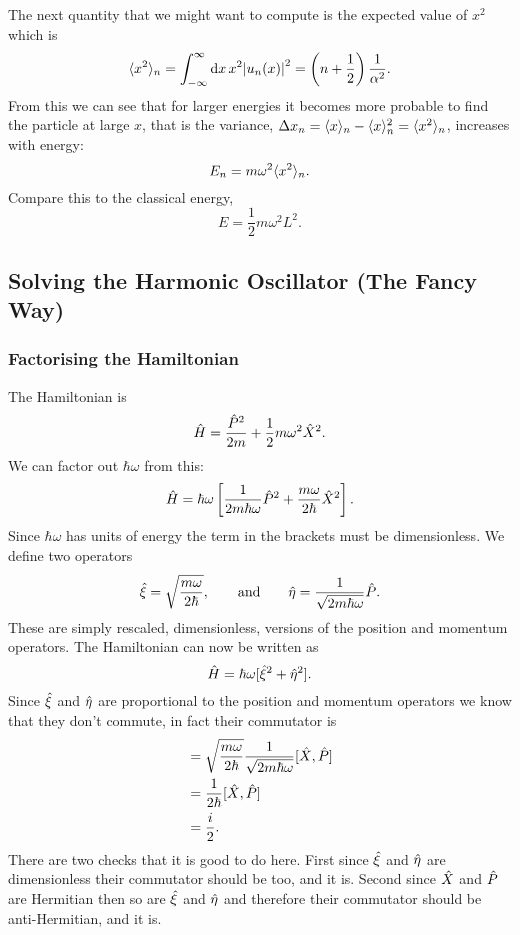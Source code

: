     The next quantity that we might want to compute is the expected value of \(x^2\) which is
    \[\langle{x^2}\rangle_n = \int_{-\infty}^{\infty} \dd{x} x^2\abs{u_n(x)}^2 = \left(n + \frac{1}{2}\right)\frac{1}{\alpha^2}.\]
    From this we can see that for larger energies it becomes more probable to find the particle at large \(x\), that is the variance, \(\Delta x_n = \langle{x}\rangle_n - \langle{x}\rangle_n^2 = \langle{x^2}\rangle_n\), increases with energy:
    \[E_n = m\omega^2\langle{x^2}\rangle_n.\]
    Compare this to the classical energy,
    \[E = \frac{1}{2}m\omega^2L^2.\]
    
    \subsection{Solving the Harmonic Oscillator (The Fancy Way)}
    \subsubsection{Factorising the Hamiltonian}
    The Hamiltonian is
    \[\hat{H} = \frac{\hat{P}^2}{2m} + \frac{1}{2}m\omega^2\hat{X}^2.\]
    We can factor out \(\hbar\omega\) from this:
    \[\hat{H} = \hbar\omega\left[\frac{1}{2m\hbar\omega}\hat{P}^2 + \frac{m\omega}{2\hbar}\hat{X}^2 \right].\]
    Since \(\hbar\omega\) has units of energy the term in the brackets must be dimensionless.
    We define two operators
    \[\hat{\xi} = \sqrt{\frac{m\omega}{2\hbar}}, \qquad\text{and}\qquad \hat{\eta} = \frac{1}{\sqrt{2m\hbar\omega}}\hat{P}.\]
    These are simply rescaled, dimensionless, versions of the position and momentum operators.
    The Hamiltonian can now be written as
    \[\hat{H} = \hbar\omega[\hat{\xi}^2 + \hat{\eta}^2].\]
    Since \(\hat{\xi}\) and \(\hat{\eta}\) are proportional to the position and momentum operators we know that they don't commute, in fact their commutator is
    \begin{align*}
        [\operator{\xi}, \operator{\eta}] &= \sqrt{\frac{m\omega}{2\hbar}}\frac{1}{\sqrt{2m\hbar\omega}} [\operator{X}, \operator{P}]\\
        &= \frac{1}{2\hbar}[\operator{X}, \operator{P}]\\
        &= \frac{i}{2}.
    \end{align*}
    There are two checks that it is good to do here.
    First since \(\hat{\xi}\) and \(\hat{\eta}\) are dimensionless their commutator should be too, and it is.
    Second since \(\hat{X}\) and \(\hat{P}\) are Hermitian then so are \(\hat{\xi}\) and \(\hat{\eta}\) and therefore their commutator should be anti-Hermitian, and it is.
    
